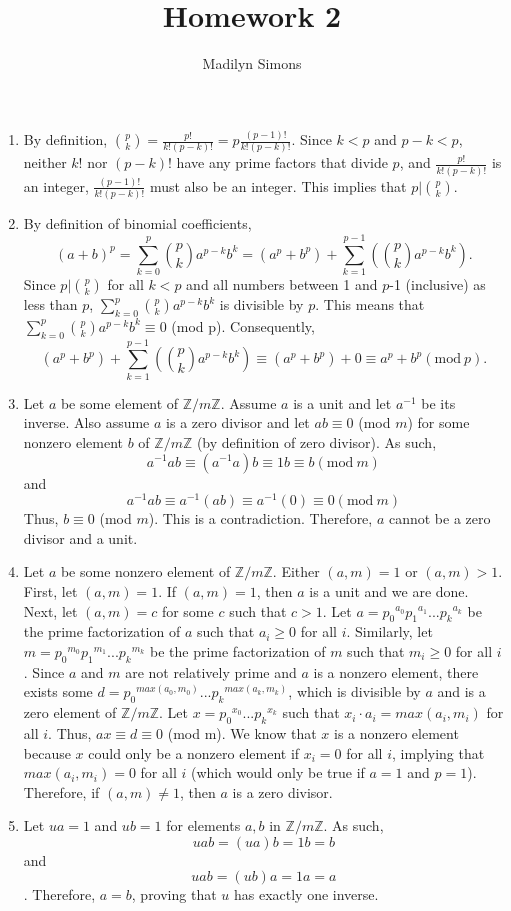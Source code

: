 \documentclass{article}
\title{Homework 2}
\author{Madilyn Simons}
\date{}
\begin{document}
\maketitle

\begin{enumerate}

\item By definition, $\binom{p}{k} = \frac{p!}{k!(p-k)!} = p\frac{(p-1)!}{k!(p-k)!}$.
Since $k < p$ and $p-k < p$, neither $k!$ nor $(p-k)!$ have any prime factors that divide $p$,
and $\frac{p!}{k!(p-k)!}$ is an integer, $\frac{(p-1)!}{k!(p-k)!}$ must also be an integer.
This implies that $p \vert \binom{p}{k}$.

\item By definition of binomial coefficients,
\[
(a+b)^p = \sum_{k=0}^{p} \binom{p}{k} a^{p-k}b^k = (a^p + b^p) +
\sum_{k=1}^{p-1} (\binom{p}{k} a^{p-k}b^k).
\]
Since $p \vert \binom{p}{k}$ for all $k < p$ and all numbers between 1 and $p$-1
(inclusive) as less than $p$, $\sum_{k=0}^{p} \binom{p}{k} a^{p-k}b^k$ is divisible
by $p$.  This means that $\sum_{k=0}^{p} \binom{p}{k} a^{p-k}b^k \equiv 0$ (mod p).
Consequently,
\[
(a^p + b^p) + \sum_{k=1}^{p-1} (\binom{p}{k} a^{p-k}b^k) \equiv (a^p + b^p) + 0
\equiv a^p + b ^p (\textrm{mod}\ p).
\]

\item Let $a$ be some element of $\mathbb{Z}/m\mathbb{Z}$.  Assume $a$ is a unit
and let $a^{-1}$ be its inverse.  Also assume $a$ is a zero divisor and let
$ab \equiv 0$ (mod $m$) for some nonzero element $b$ of $\mathbb{Z}/m\mathbb{Z}$
(by definition of zero divisor).
As such,
\[
a^{-1}ab \equiv (a^{-1}a)b \equiv 1b \equiv b (\textrm{mod}\ m)
\]
and
\[
a^{-1}ab \equiv a^{-1}(ab) \equiv a^{-1}(0) \equiv 0 (\textrm{mod}\ m)
\]
Thus, $b \equiv 0$ (mod $m$).  This is a contradiction.  Therefore, $a$ cannot
be a zero divisor and a unit.

\item Let $a$ be some nonzero element of $\mathbb{Z}/m\mathbb{Z}$.  Either $(a,m) = 1$
or $(a,m) > 1$.  First, let $(a,m) = 1$.  If $(a,m) = 1$, then $a$ is a unit
and we are done.  Next, let $(a, m) = c$ for some $c$ such that $c > 1$.
Let $a = {p_0}^{a_0}{p_1}^{a_1} ... {p_k}^{a_k}$ be the prime factorization of
$a$ such that $a_i \geq 0$ for all $i$.
Similarly, let $m = {p_0}^{m_0}{p_1}^{m_1} ... {p_k}^{m_k}$ be the prime factorization of
$m$ such that $m_i \geq 0$ for all $i$.
Since $a$ and $m$ are not relatively prime and $a$ is a nonzero element, there exists
some $d = {p_0}^{max(a_0, m_0)} ... {p_k}^{max(a_k, m_k)}$, which is divisible by $a$
and is a zero element of $\mathbb{Z}/m\mathbb{Z}$.
Let $x = {p_0}^{x_0} ... {p_k}^{x_k}$ such that $x_i \cdot a_i = max(a_i, m_i)$
for all $i$.  Thus, $ax \equiv d \equiv 0$ (mod m).  We know that $x$ is a nonzero
element because $x$ could only be a nonzero element if $x_i = 0$ for all $i$,
implying that $max(a_i, m_i) = 0$ for all $i$ (which would only be true if $a = 1$ and
$p = 1$).  Therefore, if $(a, m) \neq 1$, then $a$ is a zero divisor.

\item Let $ua = 1$ and $ub = 1$ for elements $a, b$ in $\mathbb{Z}/m\mathbb{Z}$.
As such,
\[
uab = (ua)b = 1b = b
\]
and
\[
uab = (ub)a = 1a = a
\].
Therefore, $a = b$, proving that $u$ has exactly one inverse.

\end{enumerate}
\end{document}
